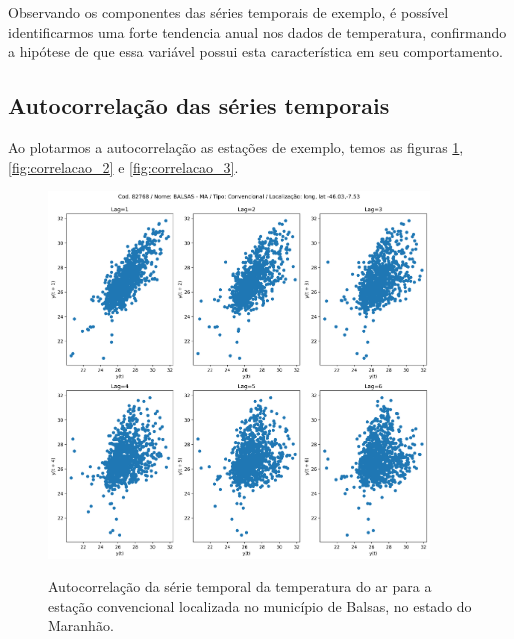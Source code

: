 Observando os componentes das séries temporais de exemplo, é possível identificarmos uma forte tendencia anual nos dados de temperatura, confirmando a hipótese de que essa variável possui esta característica em seu comportamento.

\subsection{Autocorrelação das séries temporais}

Ao plotarmos a autocorrelação as estações de exemplo, temos as figuras \ref{fig:correlacao_1}, \ref{fig:correlacao_2} e \ref{fig:correlacao_3}. 

\begin{figure}[H]
    \centering
    \caption{Autocorrelação da série temporal da temperatura do ar para a estação convencional localizada no município de Balsas, no estado do Maranhão.}
    \includegraphics[width=0.9\textwidth]{figuras/correlacao_82768.png}
    \label{fig:correlacao_1}
\end{figure}

